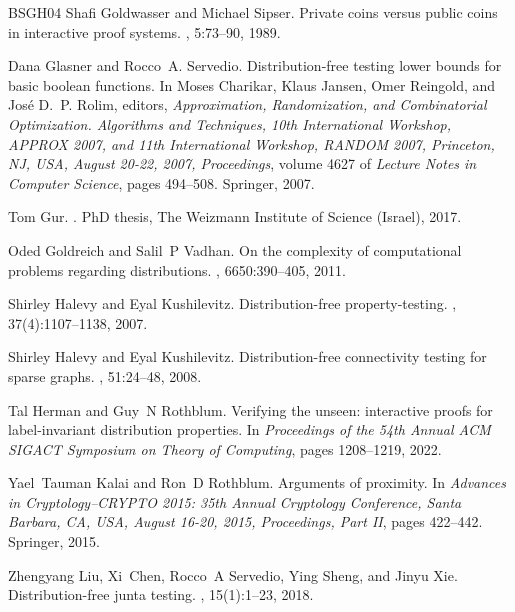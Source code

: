 \documentclass[10pt,a4paper]{article}
\begin{document}
\begin{thebibliography}{BSGH{\etalchar{+}}04}
Shafi Goldwasser and Michael Sipser.
\newblock Private coins versus public coins in interactive proof systems.
, 5:73--90, 1989.

Dana Glasner and Rocco~A. Servedio.
\newblock Distribution-free testing lower bounds for basic boolean functions.
\newblock In Moses Charikar, Klaus Jansen, Omer Reingold, and Jos{\'{e}} D.~P.
  Rolim, editors, {\em Approximation, Randomization, and Combinatorial
  Optimization. Algorithms and Techniques, 10th International Workshop,
  {APPROX} 2007, and 11th International Workshop, {RANDOM} 2007, Princeton, NJ,
  USA, August 20-22, 2007, Proceedings}, volume 4627 of {\em Lecture Notes in
  Computer Science}, pages 494--508. Springer, 2007.

Tom Gur.
.
\newblock PhD thesis, The Weizmann Institute of Science (Israel), 2017.

Oded Goldreich and Salil~P Vadhan.
\newblock On the complexity of computational problems regarding distributions.
, 6650:390--405, 2011.

Shirley Halevy and Eyal Kushilevitz.
\newblock Distribution-free property-testing.
, 37(4):1107--1138, 2007.

Shirley Halevy and Eyal Kushilevitz.
\newblock Distribution-free connectivity testing for sparse graphs.
, 51:24--48, 2008.

Tal Herman and Guy~N Rothblum.
\newblock Verifying the unseen: interactive proofs for label-invariant
  distribution properties.
\newblock In {\em Proceedings of the 54th Annual ACM SIGACT Symposium on Theory
  of Computing}, pages 1208--1219, 2022.

Yael~Tauman Kalai and Ron~D Rothblum.
\newblock Arguments of proximity.
\newblock In {\em Advances in Cryptology--CRYPTO 2015: 35th Annual Cryptology
  Conference, Santa Barbara, CA, USA, August 16-20, 2015, Proceedings, Part
  II}, pages 422--442. Springer, 2015.

Zhengyang Liu, Xi~Chen, Rocco~A Servedio, Ying Sheng, and Jinyu Xie.
\newblock Distribution-free junta testing.
, 15(1):1--23, 2018.


\end{thebibliography}
\end{document}
